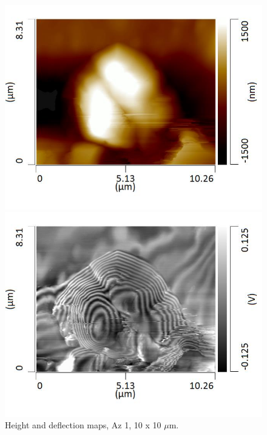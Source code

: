 \begin{figure}[H]
\centering
\begin{minipage}{.45\textwidth}
  \centering
  \includegraphics[width=\linewidth]{Az1_tapping_mode_240521_height_3}
\end{minipage}
\begin{minipage}{.45\textwidth}
  \centering
  \includegraphics[width=\linewidth]{Az1_tapping_mode_240521_def_3}
\end{minipage}
\caption[Height and deflection maps, Az 1]{Height and deflection maps, Az 1, 10 x 10 $\mu$m.}
\label{fig:afm_az1_height_def_3}
\end{figure}

